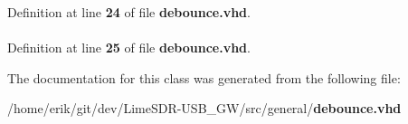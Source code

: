Definition at line {\bf 24} of file {\bf debounce.\+vhd}.

\paragraph[{std\+\_\+logic\+\_\+unsigned}]{\hspace{0.3cm}{\ttfamily [Package]}}\label{classdebounce_a598da929e807d58939b47499e8bc9fa8}


Definition at line {\bf 25} of file {\bf debounce.\+vhd}.



The documentation for this class was generated from the following file\+:\begin{DoxyCompactItemize}
\item 
/home/erik/git/dev/\+Lime\+S\+D\+R-\/\+U\+S\+B\+\_\+\+G\+W/src/general/{\bf debounce.\+vhd}\end{DoxyCompactItemize}
